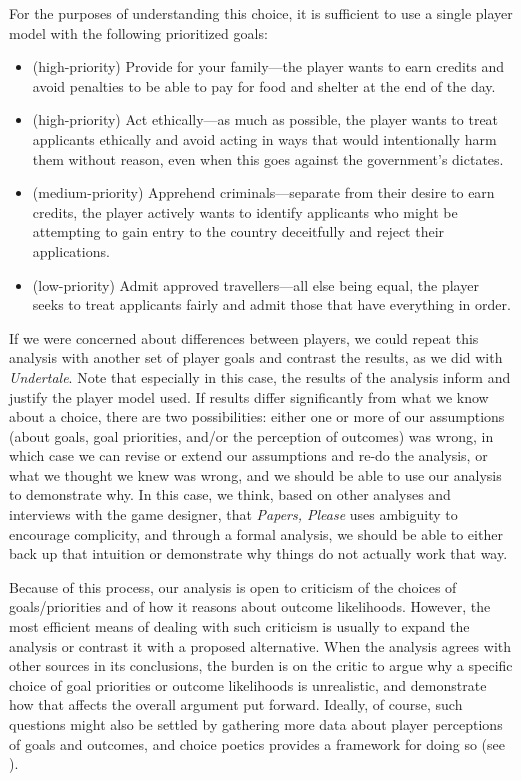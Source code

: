 \documentclass[arts,article,submit,moreauthors,pdftex,10pt,a4paper]{Definitions/mdpi}
\begin{document}
For the purposes of understanding this choice, it is sufficient to use a single player model with the following prioritized goals:
\begin{itemize}
  \item (high-priority) Provide for your family---the player wants to earn credits and avoid penalties to be able to pay for food and shelter at the end of the day.
  \item (high-priority) Act ethically---as much as possible, the player wants to treat applicants ethically and avoid acting in ways that would intentionally harm them without reason, even when this goes against the government's dictates.
  \item (medium-priority) Apprehend criminals---separate from their desire to earn credits, the player actively wants to identify applicants who might be attempting to gain entry to the country deceitfully and reject their applications.
  \item (low-priority) Admit approved travellers---all else being equal, the player seeks to treat applicants fairly and admit those that have everything in order.
\end{itemize}
If we were concerned about differences between players, we could repeat this analysis with another set of player goals and contrast the results, as we did with \emph{Undertale}.
%
Note that especially in this case, the results of the analysis inform and justify the player model used.
%
If results differ significantly from what we know about a choice, there are two possibilities: either one or more of our assumptions (about goals, goal priorities, and/or the perception of outcomes) was wrong, in which case we can revise or extend our assumptions and re-do the analysis, or what we thought we knew was wrong, and we should be able to use our analysis to demonstrate why.
%
In this case, we think, based on other analyses and interviews with the game designer, that \emph{Papers, Please} uses ambiguity to encourage complicity, and through a formal analysis, we should be able to either back up that intuition or demonstrate why things do not actually work that way.


Because of this process, our analysis is open to criticism of the choices of goals/priorities and of how it reasons about outcome likelihoods.
%
However, the most efficient means of dealing with such criticism is usually to expand the analysis or contrast it with a proposed alternative.
%
When the analysis agrees with other sources in its conclusions, the burden is on the critic to argue why a specific choice of goal priorities or outcome likelihoods is unrealistic, and demonstrate how that affects the overall argument put forward.
%
Ideally, of course, such questions might also be settled by gathering more data about player perceptions of goals and outcomes, and choice poetics provides a framework for doing so (see \cite{mawhorter2015intentionally}).
\end{document}
